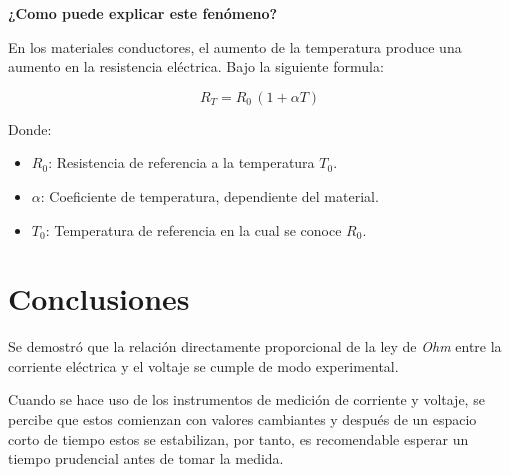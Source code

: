 \documentclass[letter,11pt]{article}
\begin{document}
\begin{enumerate}
\textbf{¿Como puede explicar este fenómeno?}

En los materiales conductores, el aumento de la temperatura produce una
aumento en la resistencia eléctrica. Bajo la siguiente formula:

\begin{equation*}
    R_T=R_0\,(1+\alpha T)
\end{equation*}

Donde:

\begin{itemize}
    \item $R_0$: Resistencia de referencia a la temperatura $T_0$.
    \item $\alpha$: Coeficiente de temperatura, dependiente del material.
    \item $T_0$: Temperatura de referencia en la cual se conoce $R_0$.
\end{itemize}

\end{enumerate}

\section{Conclusiones}
Se demostró que la relación directamente proporcional de la ley de \emph{Ohm}
entre la corriente eléctrica y el voltaje se cumple de modo experimental.

Cuando se hace uso de los instrumentos de medición de corriente y voltaje, se
percibe que estos comienzan con valores cambiantes y después de un espacio corto
de tiempo estos se estabilizan, por tanto, es recomendable esperar un tiempo
prudencial antes de tomar la medida.
\end{document}
